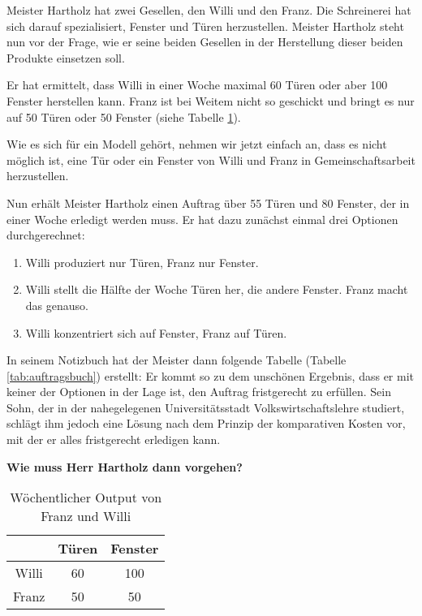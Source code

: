 
Meister Hartholz hat zwei Gesellen, den Willi und den Franz.  
Die Schreinerei hat sich darauf spezialisiert, Fenster und Türen herzustellen.  
Meister Hartholz steht nun vor der Frage, wie er seine beiden Gesellen in der Herstellung dieser beiden Produkte einsetzen soll.

Er hat ermittelt, dass Willi in einer Woche maximal 60 Türen oder aber 100 Fenster herstellen kann. Franz ist bei Weitem nicht so geschickt und bringt es nur auf 50 Türen oder 50 Fenster (siehe Tabelle \ref{tab:output}).  

Wie es sich für ein Modell gehört, nehmen wir jetzt einfach an, dass es nicht möglich ist, eine Tür oder ein Fenster von Willi und Franz in Gemeinschaftsarbeit herzustellen.

Nun erhält Meister Hartholz einen Auftrag über 55 Türen und 80 Fenster, der in einer Woche erledigt werden muss.  
Er hat dazu zunächst einmal drei Optionen durchgerechnet:

\begin{enumerate}[label=(\alph*)]
    \item Willi produziert nur Türen, Franz nur Fenster.
    \item Willi stellt die Hälfte der Woche Türen her, die andere Fenster. Franz macht das genauso.
    \item Willi konzentriert sich auf Fenster, Franz auf Türen.
\end{enumerate}

In seinem Notizbuch hat der Meister dann folgende Tabelle (Tabelle \ref{tab:auftragsbuch}) erstellt:  
Er kommt so zu dem unschönen Ergebnis, dass er mit keiner der Optionen in der Lage ist, den Auftrag fristgerecht zu erfüllen. Sein Sohn, der in der nahegelegenen Universitätsstadt Volkswirtschaftslehre studiert, schlägt ihm jedoch eine Lösung nach dem Prinzip der komparativen Kosten vor, mit der er alles fristgerecht erledigen kann.  

\textbf{Wie muss Herr Hartholz dann vorgehen?}

\begin{table}[h!]
    \centering
    \begin{tabular}{|c|c|c|}
        \hline
        & \textbf{Türen} & \textbf{Fenster} \\
        \hline
        Willi & 60 & 100 \\
        \hline
        Franz & 50 & 50 \\
        \hline
    \end{tabular}
    \caption{Wöchentlicher Output von Franz und Willi}
    \label{tab:output}
\end{table}

